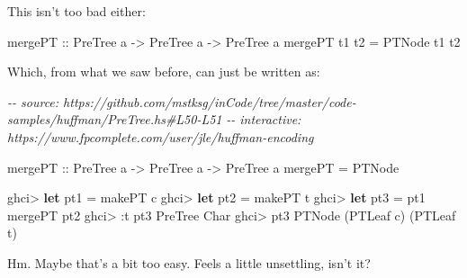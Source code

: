 \documentclass[]{article}
\newenvironment{Shaded}{}{}
\newcommand{\CharTok}[1]{\textcolor[rgb]{0.25,0.44,0.63}{#1}}
\newcommand{\CommentTok}[1]{\textcolor[rgb]{0.38,0.63,0.69}{\textit{#1}}}
\newcommand{\DataTypeTok}[1]{\textcolor[rgb]{0.56,0.13,0.00}{#1}}
\newcommand{\KeywordTok}[1]{\textcolor[rgb]{0.00,0.44,0.13}{\textbf{#1}}}
\newcommand{\NormalTok}[1]{#1}
\newcommand{\OperatorTok}[1]{\textcolor[rgb]{0.40,0.40,0.40}{#1}}
\newcommand{\OtherTok}[1]{\textcolor[rgb]{0.00,0.44,0.13}{#1}}
\begin{document}
This isn't too bad either:

\begin{Shaded}
\begin{Highlighting}[]
\OtherTok{mergePT\textquotesingle{} ::} \DataTypeTok{PreTree}\NormalTok{ a }\OtherTok{{-}>} \DataTypeTok{PreTree}\NormalTok{ a }\OtherTok{{-}>} \DataTypeTok{PreTree}\NormalTok{ a}
\NormalTok{mergePT\textquotesingle{} t1 t2 }\OtherTok{=} \DataTypeTok{PTNode}\NormalTok{ t1 t2}
\end{Highlighting}
\end{Shaded}

Which, from what we saw before, can just be written as:

\begin{Shaded}
\begin{Highlighting}[]
\CommentTok{{-}{-} source: https://github.com/mstksg/inCode/tree/master/code{-}samples/huffman/PreTree.hs\#L50{-}L51}
\CommentTok{{-}{-} interactive: https://www.fpcomplete.com/user/jle/huffman{-}encoding}

\OtherTok{mergePT ::} \DataTypeTok{PreTree}\NormalTok{ a }\OtherTok{{-}>} \DataTypeTok{PreTree}\NormalTok{ a }\OtherTok{{-}>} \DataTypeTok{PreTree}\NormalTok{ a}
\NormalTok{mergePT }\OtherTok{=} \DataTypeTok{PTNode}
\end{Highlighting}
\end{Shaded}

\begin{Shaded}
\begin{Highlighting}[]
\NormalTok{ghci}\OperatorTok{>} \KeywordTok{let}\NormalTok{ pt1 }\OtherTok{=}\NormalTok{ makePT }\CharTok{\textquotesingle{}c\textquotesingle{}}
\NormalTok{ghci}\OperatorTok{>} \KeywordTok{let}\NormalTok{ pt2 }\OtherTok{=}\NormalTok{ makePT }\CharTok{\textquotesingle{}t\textquotesingle{}}
\NormalTok{ghci}\OperatorTok{>} \KeywordTok{let}\NormalTok{ pt3 }\OtherTok{=}\NormalTok{ pt1 }\OtherTok{\textasciigrave{}mergePT\textasciigrave{}}\NormalTok{ pt2}
\NormalTok{ghci}\OperatorTok{>} \OperatorTok{:}\NormalTok{t pt3}
\DataTypeTok{PreTree} \DataTypeTok{Char}
\NormalTok{ghci}\OperatorTok{>}\NormalTok{ pt3}
\DataTypeTok{PTNode}\NormalTok{ (}\DataTypeTok{PTLeaf} \CharTok{\textquotesingle{}c\textquotesingle{}}\NormalTok{) (}\DataTypeTok{PTLeaf} \CharTok{\textquotesingle{}t\textquotesingle{}}\NormalTok{)}
\end{Highlighting}
\end{Shaded}

Hm. Maybe that's a bit too easy. Feels a little unsettling, isn't it?
\end{document}
